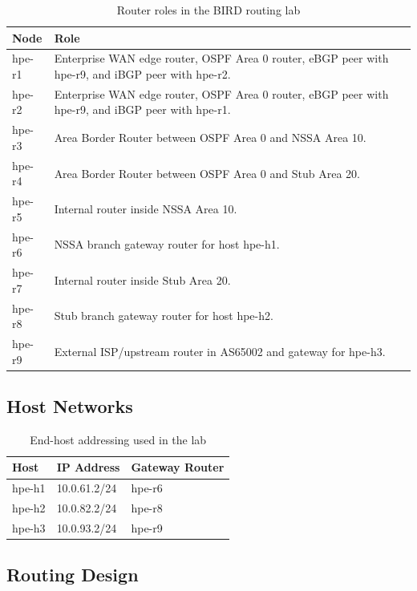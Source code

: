 \begin{table}[h]
\centering
\begin{tabular}{|l|p{9cm}|}
\hline
\textbf{Node} & \textbf{Role} \\
\hline
hpe-r1 & Enterprise WAN edge router, OSPF Area 0 router, eBGP peer with hpe-r9, and iBGP peer with hpe-r2. \\
\hline
hpe-r2 & Enterprise WAN edge router, OSPF Area 0 router, eBGP peer with hpe-r9, and iBGP peer with hpe-r1. \\
\hline
hpe-r3 & Area Border Router between OSPF Area 0 and NSSA Area 10. \\
\hline
hpe-r4 & Area Border Router between OSPF Area 0 and Stub Area 20. \\
\hline
hpe-r5 & Internal router inside NSSA Area 10. \\
\hline
hpe-r6 & NSSA branch gateway router for host hpe-h1. \\
\hline
hpe-r7 & Internal router inside Stub Area 20. \\
\hline
hpe-r8 & Stub branch gateway router for host hpe-h2. \\
\hline
hpe-r9 & External ISP/upstream router in AS65002 and gateway for hpe-h3. \\
\hline
\end{tabular}
\caption{Router roles in the BIRD routing lab}
\end{table}

\subsection{Host Networks}

\begin{table}[h]
\centering
\begin{tabular}{|l|l|l|}
\hline
\textbf{Host} & \textbf{IP Address} & \textbf{Gateway Router} \\
\hline
hpe-h1 & 10.0.61.2/24 & hpe-r6 \\
\hline
hpe-h2 & 10.0.82.2/24 & hpe-r8 \\
\hline
hpe-h3 & 10.0.93.2/24 & hpe-r9 \\
\hline
\end{tabular}
\caption{End-host addressing used in the lab}
\end{table}

\subsection{Routing Design}


